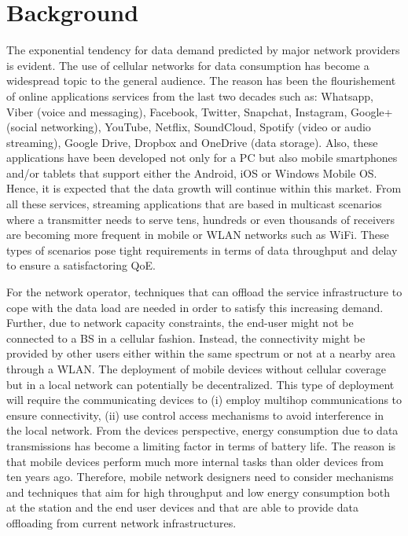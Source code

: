 \section{Background}\label{sec:background}

The exponential tendency for data demand predicted by major network providers \cite{cisco2016forecast,kremling2015presentation} is evident. The use of cellular networks for data consumption has become a widespread topic to the general audience. The reason has been the flourishement of online applications services from the last two decades such as:  Whatsapp, Viber (voice and messaging), Facebook, Twitter, Snapchat, Instagram, Google+ (social networking), YouTube, Netflix, SoundCloud, Spotify (video or audio streaming), Google Drive, Dropbox and OneDrive (data storage). Also, these applications have been developed not only for a \ac{PC} but also mobile smartphones and/or tablets that support either the Android, iOS or Windows Mobile \ac{OS}. Hence, it is expected that the data growth will continue within this market. From all these services, streaming applications that are based in multicast scenarios where a transmitter needs to serve tens, hundreds or even thousands of receivers are becoming more frequent in mobile or \ac{WLAN} networks such as \ac{WiFi}. These types of scenarios pose tight requirements in terms of data throughput and delay to ensure a satisfactoring \ac{QoE}.

For the network operator, techniques that can offload the service infrastructure to cope with the data load are needed in order to satisfy this increasing demand. Further, due to network capacity constraints, the end-user might not be connected to a \ac{BS} in a cellular fashion. Instead, the connectivity might be provided by other users either within the same spectrum or not at a nearby area through a \ac{WLAN}. The deployment of mobile devices without cellular coverage but in a local network can potentially be decentralized. This type of deployment will require the communicating devices to (i) employ multihop communications to ensure connectivity, (ii) use control access mechanisms to avoid interference in the local network. From the devices perspective, energy consumption due to data transmissions has become a limiting factor in terms of battery life. The reason is that mobile devices perform much more internal tasks than older devices from ten years ago. Therefore, mobile network designers need to consider mechanisms and techniques that aim for high throughput and low energy consumption both at the station and the end user devices and that are able to provide data offloading from current network infrastructures.

